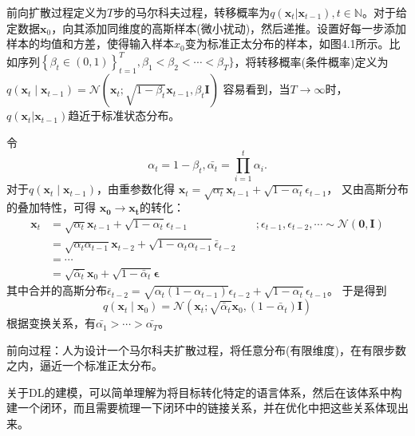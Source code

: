 前向扩散过程定义为$T$步的马尔科夫过程，转移概率为$q(\mathbf{x}_t|\mathbf{x}_{t-1}), t \in \mathbb{N}$。对于给定数据$\mathbf{x}_0$，向其添加同维度的高斯样本(微小扰动)，然后递推。设置好每一步添加样本的均值和方差，使得输入样本$x_0$变为标准正太分布的样本，如图4.1所示。比如序列$\left\{\beta_t \in(0,1)\right\}_{t=1}^T, \beta_1 < \beta_2 < \cdots < \beta_T\}$，将转移概率(条件概率)定义为$q\left(\mathbf{x}_t \mid \mathbf{x}_{t-1}\right)=\mathcal{N}\left(\mathbf{x}_t ; \sqrt{1-\beta_t} \mathbf{x}_{t-1}, \beta_t \mathbf{I}\right)$ 容易看到，当$T \rightarrow \infty$时，$q(\mathbf{x}_t|\mathbf{x}_{t-1})$趋近于标准状态分布。

令
\begin{equation}
\alpha_t = 1 - \beta_t, \bar{\alpha_{t}} = \prod_{i=1}^{t}\alpha_i.
\end{equation}
对于$q\left(\mathbf{x}_t \mid \mathbf{x}_{t-1}\right)$，由重参数化得
$\mathbf{x}_t =\sqrt{\alpha_t} \mathbf{x}_{t-1}+\sqrt{1-\alpha_t} \epsilon_{t-1}$，
又由高斯分布的叠加特性，可得
$\mathbf{x_0} \rightarrow \mathbf{x_t}$的转化：
\begin{equation}
\begin{array}{rlr}
\mathbf{x}_t & =\sqrt{\alpha_t} \mathbf{x}_{t-1}+\sqrt{1-\alpha_t} \epsilon_{t-1} & \quad ;  \epsilon_{t-1}, \epsilon_{t-2}, \cdots \sim \mathcal{N}(\mathbf{0}, \mathbf{I}) \\
& =\sqrt{\alpha_t \alpha_{t-1}} \mathbf{x}_{t-2}+\sqrt{1-\alpha_t \alpha_{t-1}} \bar{\epsilon}_{t-2}  \\
& =\cdots & \\
& =\sqrt{\bar{\alpha}_t} \mathbf{x}_0+\sqrt{1-\bar{\alpha}_t} \boldsymbol{\epsilon}
\end{array}
\end{equation}
其中合并的高斯分布$\bar{\epsilon}_{t-2} = \sqrt{\alpha_{t}(1-\alpha_{t-1})}\epsilon_{t-2} + \sqrt{1-\alpha_t}\epsilon_{t-1}$。
于是得到
\begin{equation}
q\left(\mathbf{x}_t \mid \mathbf{x}_0\right)=\mathcal{N}\left(\mathbf{x}_t ; \sqrt{\bar{\alpha}_t} \mathbf{x}_0,\left(1-\bar{\alpha}_t\right) \mathbf{I}\right)
\end{equation}
根据变换关系，有$\bar{\alpha_1} > \cdots > \bar{\alpha_T}$。

前向过程：人为设计一个马尔科夫扩散过程，将任意分布(有限维度)，在有限步数之内，逼近一个标准正太分布。

关于DL的建模，可以简单理解为将目标转化特定的语言体系，然后在该体系中构建一个闭环，而且需要梳理一下闭环中的链接关系，并在优化中把这些关系体现出来。

